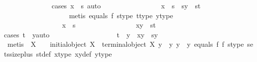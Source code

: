 \begin{isabellebody}
\ \ \ \ \ \ \ \ \ \ \ \ \ \isamarkupfalse%
{\isacharparenleft}{\kern0pt}cases\ {\isachardoublequoteopen}x\ {\isacharequal}{\kern0pt}\ s{\isachardoublequoteclose}{\isacharcomma}{\kern0pt}\ auto{\isacharparenright}{\kern0pt}\isanewline
\ \ \ \ \ \ \ \ \ \ \ \ \ \ \ \isamarkupfalse%
\ {\isachardoublequoteopen}x\ {\isacharequal}{\kern0pt}\ s\ {\isasymLongrightarrow}\ {\isasymlangle}s{\isacharcomma}{\kern0pt}y{\isasymrangle}\ {\isacharequal}{\kern0pt}\ {\isasymlangle}s{\isacharcomma}{\kern0pt}t{\isasymrangle}{\isachardoublequoteclose}\isanewline
\ \ \ \ \ \ \ \ \ \ \ \ \ \ \ \ \ \isamarkupfalse%
\ {\isacharparenleft}{\kern0pt}metis\ equals{}\ f{}\ s{\isacharunderscore}{\kern0pt}type\ t{\isacharunderscore}{\kern0pt}type\ y{\isacharunderscore}{\kern0pt}type{\isacharparenright}{\kern0pt}\isanewline
\ \ \ \ \ \ \ \ \ \ \ \ \ \isamarkupfalse%
\isanewline
\ \ \ \ \ \ \ \ \ \ \ \ \ \ \ \isamarkupfalse%
\ {\isachardoublequoteopen}x\ {\isasymnoteq}\ s{\isachardoublequoteclose}\isanewline
\ \ \ \ \ \ \ \ \ \ \ \ \ \ \ \isamarkupfalse%
\ {\isachardoublequoteopen}{\isasymlangle}x{\isacharcomma}{\kern0pt}y{\isasymrangle}\ {\isacharequal}{\kern0pt}\ {\isasymlangle}s{\isacharcomma}{\kern0pt}t{\isasymrangle}{\isachardoublequoteclose}\isanewline
\ \ \ \ \ \ \ \ \ \ \ \ \ \ \ \isamarkupfalse%
{\isacharparenleft}{\kern0pt}cases\ {\isachardoublequoteopen}t\ {\isacharequal}{\kern0pt}\ y{}{\isachardoublequoteclose}{\isacharcomma}{\kern0pt}auto{\isacharparenright}{\kern0pt}\isanewline
\ \ \ \ \ \ \ \ \ \ \ \ \ \ \ \ \ \isamarkupfalse%
\ {\isachardoublequoteopen}t\ {\isacharequal}{\kern0pt}\ y{}\ {\isasymLongrightarrow}\ {\isasymlangle}x{\isacharcomma}{\kern0pt}y{\isasymrangle}\ {\isacharequal}{\kern0pt}\ {\isasymlangle}s{\isacharcomma}{\kern0pt}y{}{\isasymrangle}{\isachardoublequoteclose}\isanewline
\ \ \ \ \ \ \ \ \ \ \ \ \ \ \ \ \ \ \ \isamarkupfalse%
\ {\isacharparenleft}{\kern0pt}metis\ {\isacartoucheopen}{\isasymnot}\ X\ {\isasymcong}\ {\isasymOmega}{\isacartoucheclose}\ {\isacartoucheopen}{\isasymnot}\ initial{\isacharunderscore}{\kern0pt}object\ X{\isacartoucheclose}\ {\isacartoucheopen}{\isasymnot}\ terminal{\isacharunderscore}{\kern0pt}object\ X{\isacartoucheclose}\ {\isacartoucheopen}y\ {\isacharequal}{\kern0pt}\ y{}{\isacartoucheclose}\ {\isacartoucheopen}y\ {\isasymnoteq}\ y{}{\isacartoucheclose}\ equals\ f{}\ f{}\ s{\isacharunderscore}{\kern0pt}type\ sets{\isacharunderscore}{\kern0pt}size{\isacharunderscore}{\kern0pt}{}{\isacharunderscore}{\kern0pt}plus\ st{\isacharunderscore}{\kern0pt}def\ x{\isacharunderscore}{\kern0pt}type\ xy{\isacharunderscore}{\kern0pt}def\ y{}{\isacharunderscore}{\kern0pt}type{\isacharparenright}{\kern0pt}\isanewline

\end{isabellebody}
